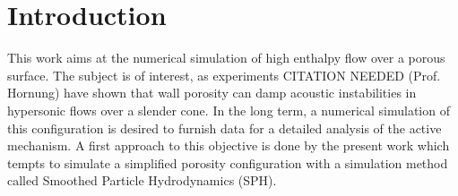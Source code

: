 \documentclass[11pt,a4paper,twoside]{report}
\newcommand{\clearemptydoublepage}{{\cleardoublepage\pagestyle{empty}}}
\begin{document}
\tableofcontents
\cleardoublepage

\setcounter{table}{0} \setcounter{figure}{0}
\setcounter{equation}{0}


\cleardoublepage

\fancyhf{}
\cfoot{}

 \setcounter{page}{1}


\pagestyle{fancyplain}

\clearemptydoublepage

\chapter{Introduction}
\label{sec:intro}


This work aims at the numerical simulation of high enthalpy flow over a porous
surface. The subject is of interest, as experiments CITATION
NEEDED (Prof. Hornung) have shown that wall porosity can damp
acoustic instabilities in hypersonic flows over a slender cone. In the long term, a numerical simulation of this configuration is desired to furnish data for a detailed analysis of the active mechanism. A first approach to this objective is done by the present work which tempts to simulate a simplified porosity configuration with a simulation method called Smoothed Particle Hydrodynamics (SPH). 
\end{document}
